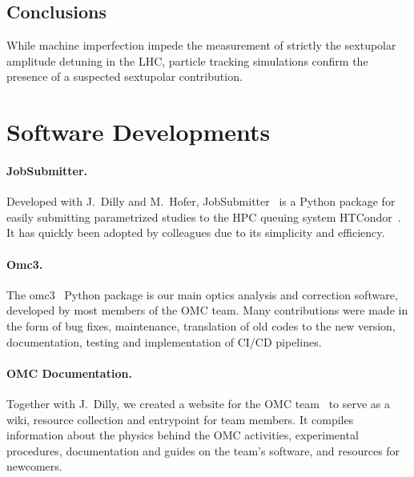 \subsection*{Conclusions}

While machine imperfection impede the measurement of strictly the sextupolar amplitude detuning in the LHC, particle tracking simulations confirm the presence of a suspected sextupolar contribution.

\section{Software Developments}

\newcommand{\ilparagraph}[1]{\paragraph{\bfseries #1\textcolor{cern}{.}}}


\ilparagraph{JobSubmitter}
Developed with J.~Dilly and M.~Hofer, JobSubmitter~\cite{CODE:OMC:pylhc_submitter} is a Python package for easily submitting parametrized studies to the HPC queuing system HTCondor~\cite{CODE:Douglas:condor-practice}.
It has quickly been adopted by colleagues due to its simplicity and efficiency.

\ilparagraph{Omc3}
The omc3~\cite{CODE:OMC:omc3} Python package is our main optics analysis and correction software, developed by most members of the OMC team.
Many contributions were made in the form of bug fixes, maintenance, translation of old codes to the new version, documentation, testing and implementation of CI/CD pipelines.

\ilparagraph{OMC Documentation}
Together with J.~Dilly, we created a website for the OMC team~\cite{Website:OMC_Documentation} to serve as a wiki, resource collection and entrypoint for team members.
It compiles information about the physics behind the OMC activities, experimental procedures, documentation and guides on the team's software, and resources for newcomers.

